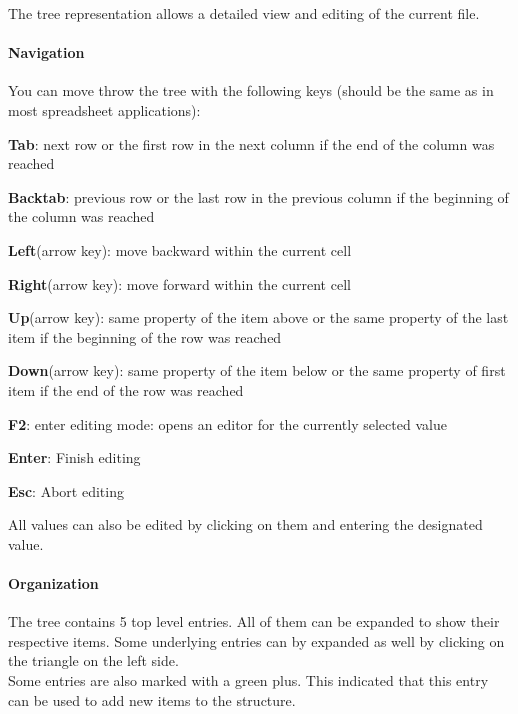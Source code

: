 \documentclass[a4paper,11pt]{report}
\begin{document}
The tree representation allows a detailed view and editing of the current file. 

\paragraph{Navigation}
You can move throw the tree with the following keys (should be the same as in most spreadsheet applications):
\begin{trivlist}
	\leftskip=1cm
	\item[] \textbf{Tab}: next row or the first row in the next column if the end of the column was reached
	\item[] \textbf{Backtab}: previous row or the last row in the previous column if the beginning of the column was reached
	\item[] \textbf{Left}(arrow key): move backward within the current cell
	\item[] \textbf{Right}(arrow key): move forward within the current cell
	\item[] \textbf{Up}(arrow key): same property of the item above or the same property of the last item if the beginning of the row was reached
	\item[] \textbf{Down}(arrow key): same property of the item below or the same property of first item if the end of the row was reached
	\item[] \textbf{F2}: enter editing mode: opens an editor for the currently selected value
	\item[] \textbf{Enter}: Finish editing
	\item[] \textbf{Esc}: Abort editing
\end{trivlist}


All values can also be edited by clicking on them and entering the designated value.\\

\paragraph{Organization}

The tree contains 5 top level entries. All of them can be expanded to show their respective items. Some underlying entries can by expanded as well by clicking on the triangle on the left side.\\

Some entries are also marked with a green plus. This indicated that this entry can be used to add new items to the structure.
\end{document}
